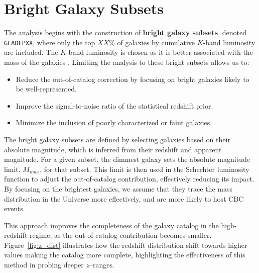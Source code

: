 \section{Bright Galaxy Subsets}
The analysis begins with the construction of \textbf{bright galaxy subsets}, denoted \texttt{GLADEPXX}, where only the top $XX\%$ of galaxies by cumulative $K$-band luminosity are included. The $K$-band luminosity is chosen as it is better associated with the mass of the galaxies \citep{strazzullo2006near,sureshkumar2021galaxy}. Limiting the analysis to these bright subsets allows us to:
\vspace{-1em}
\begin{itemize}
  \item Reduce the out-of-catalog correction by focusing on bright galaxies likely to be well-represented.
  \vspace{-1em}
  \item Improve the signal-to-noise ratio of the statistical redshift prior.
  \vspace{-1em}
  \item Minimize the inclusion of poorly characterized or faint galaxies.
\end{itemize}

The bright galaxy subsets are defined by selecting galaxies based on their absolute magnitude, which is inferred from their redshift and apparent magnitude. For a given subset, the dimmest galaxy sets the absolute magnitude limit, $M_{max}$, for that subset. This limit is then used in the Schechter luminosity function to adjust the out-of-catalog contribution, effectively reducing its impact. By focusing on the brightest galaxies, we assume that they trace the mass distribution in the Universe more effectively, and are more likely to host \ac{CBC} events.

This approach improves the completeness of the galaxy catalog in the high-redshift regime, as the out-of-catalog contribution becomes smaller. Figure~\ref{fig:z_dist} illustrates how the redshift distribution shift towards higher values making the catalog more complete, highlighting the effectiveness of this method in probing deeper $z$--ranges.

